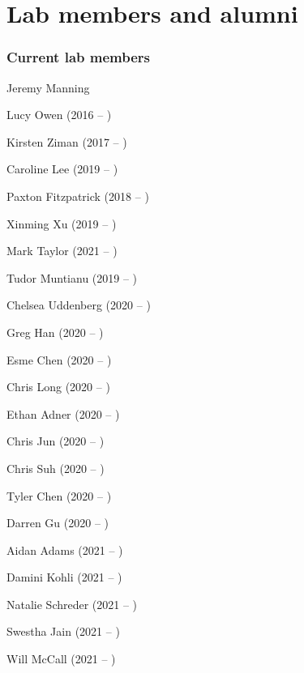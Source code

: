 \documentclass{tufte-book} %
\begin{document}
\chapter{Lab members and alumni}\label{ch:members}
\begin{fullwidth}
\subsection{Current lab members}\label{sec:curr_members}
\bigskip

\enskip Jeremy Manning


\begin{multicols}{2}\raggedcolumns
\begin{list}{\quad}{}
\item Lucy Owen (2016 -- )
\item Kirsten Ziman (2017 -- )
\item Caroline Lee (2019 -- )
\end{list}
\end{multicols}


\bigskip

\enskip Paxton Fitzpatrick (2018 -- )


\begin{multicols}{2}\raggedcolumns
\begin{list}{\quad}{}
\item Xinming Xu (2019 -- )
\item Mark Taylor (2021 -- )
\end{list}
\end{multicols}


\begin{multicols}{2}\raggedcolumns
\begin{list}{\quad}{}
\item Tudor Muntianu (2019 -- )
\item Chelsea Uddenberg (2020 -- )
\item Greg Han (2020 -- )
\item Esme Chen (2020 -- )
\item Chris Long (2020 -- )
\item Ethan Adner (2020 -- )
\item Chris Jun (2020 -- )
\item Chris Suh (2020 -- )
\item Tyler Chen (2020 -- )
\item Darren Gu (2020 -- )
\item Aidan Adams (2021 -- )
\item Damini Kohli (2021 -- )
\item Natalie Schreder (2021 -- )
\item Swestha Jain (2021 -- )
\item Will McCall (2021 -- )
\end{list}
\end{multicols}


\end{fullwidth}
\end{document}
